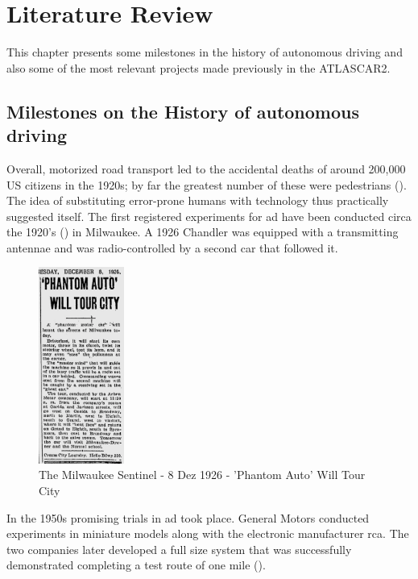 \chapter{Literature Review}

This chapter presents some milestones in the history of autonomous driving and also some of the most relevant projects made previously in the ATLASCAR2.


\section{Milestones on the History of autonomous driving}

Overall, motorized road transport led to the accidental deaths of around 200,000 US citizens in the 1920s; by far the greatest number of these were pedestrians (\cite{Kroger2016}). The idea of substituting error-prone humans with technology thus practically suggested itself. The first registered experiments for \gls{ad} have been conducted circa the 1920's (\cite{TheMilwaukeeSentinel}) in Milwaukee. A 1926 Chandler was equipped with a transmitting antennae and was radio-controlled by a second car that followed it.

\begin{figure}[htp]
	
	\centering
	\includegraphics[width=0.25\textwidth]{capstate/imgs/jornal.png}
	
	\caption{The Milwaukee Sentinel - 8 Dez 1926 - 'Phantom Auto' Will Tour City}
	\label{fig:waymo}
	
\end{figure}

In the 1950s promising trials in \gls{ad} took place. General Motors conducted experiments in miniature models along with the electronic manufacturer \gls{rca}. The two companies later developed a full size system that was successfully demonstrated completing a test route of one mile (\cite{Kroger2016}).

